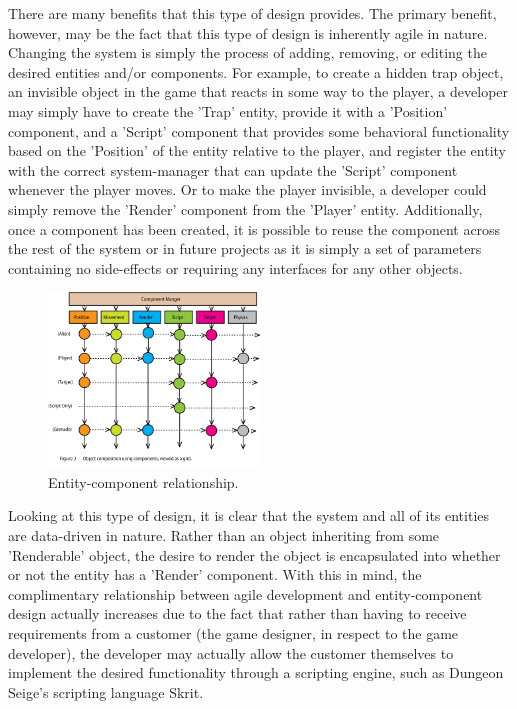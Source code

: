 There are many benefits that this type of design provides. The primary benefit, however, may be the fact that this type of design is inherently agile in nature. Changing the system is simply the process of adding, removing, or editing the desired entities and/or components. For example, to create a hidden trap object, an invisible object in the game that reacts in some way to the player, a developer may simply have to create the 'Trap' entity, provide it with a 'Position' component, and a 'Script' component that provides some behavioral functionality based on the 'Position' of the entity relative to the player, and register the entity with the correct system-manager that can update the 'Script' component whenever the player moves. Or to make the player invisible, a developer could simply remove the 'Render' component from the 'Player' entity. Additionally, once a component has been created, it is possible to reuse the component across the rest of the system or in future projects as it is simply a set of parameters containing no side-effects or requiring any interfaces for any other objects.

\begin{figure}[!ht]
  \centering \includegraphics[width=0.5\textwidth]{Images/aggregation.png}
  \caption{Entity-component relationship.\cite{evolve_your_hierarchy}}
\end{figure}

Looking at this type of design, it is clear that the system and all of its entities are data-driven in nature. Rather than an object inheriting from some 'Renderable' object, the desire to render the object is encapsulated into whether or not the entity has a 'Render' component. With this in mind, the complimentary relationship between agile development and entity-component design actually increases due to the fact that rather than having to receive requirements from a customer (the game designer, in respect to the game developer), the developer may actually allow the customer themselves to implement the desired functionality through a scripting engine, such as Dungeon Seige's scripting language Skrit.

